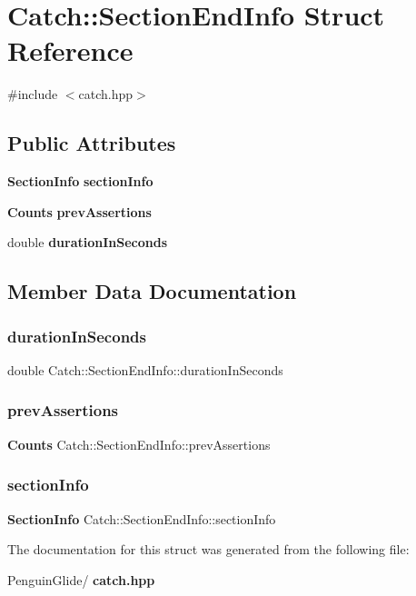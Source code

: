 \section{Catch\+::Section\+End\+Info Struct Reference}
\label{struct_catch_1_1_section_end_info}


{\ttfamily \#include $<$catch.\+hpp$>$}

\subsection*{Public Attributes}
\begin{DoxyCompactItemize}
\item 
\textbf{ Section\+Info} \textbf{ section\+Info}
\item 
\textbf{ Counts} \textbf{ prev\+Assertions}
\item 
double \textbf{ duration\+In\+Seconds}
\end{DoxyCompactItemize}


\subsection{Member Data Documentation}
\mbox{\label{struct_catch_1_1_section_end_info_a7c262f2dab9cff166b8eca620c47eea5}} 
\subsubsection{durationInSeconds}
{\footnotesize\ttfamily double Catch\+::\+Section\+End\+Info\+::duration\+In\+Seconds}

\mbox{\label{struct_catch_1_1_section_end_info_ae70b154cbc05b5dd2901d97f89303d8c}} 
\subsubsection{prevAssertions}
{\footnotesize\ttfamily \textbf{ Counts} Catch\+::\+Section\+End\+Info\+::prev\+Assertions}

\mbox{\label{struct_catch_1_1_section_end_info_a2d44793392cb83735d086d726822abe9}} 
\subsubsection{sectionInfo}
{\footnotesize\ttfamily \textbf{ Section\+Info} Catch\+::\+Section\+End\+Info\+::section\+Info}



The documentation for this struct was generated from the following file\+:\begin{DoxyCompactItemize}
\item 
Penguin\+Glide/\textbf{ catch.\+hpp}\end{DoxyCompactItemize}
